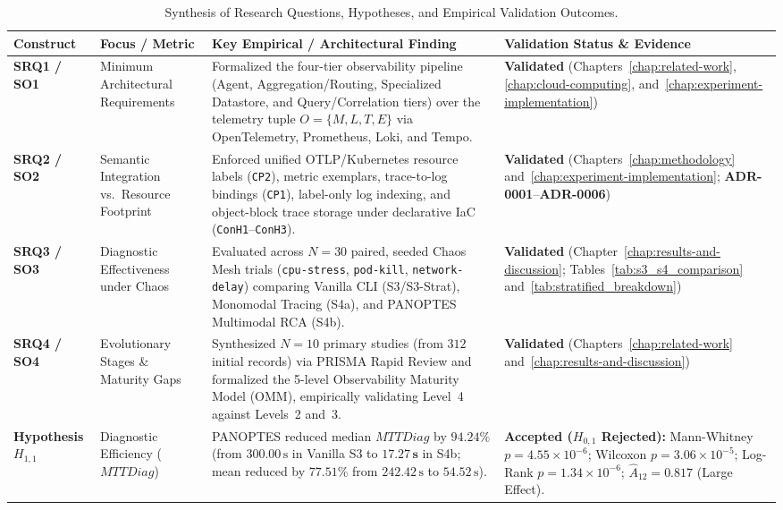 \begin{table}[htbp]
    \centering
    \caption{Synthesis of Research Questions, Hypotheses, and Empirical Validation Outcomes.}
    \label{tab:rq_hypothesis_synthesis}
    \footnotesize
    \renewcommand{\arraystretch}{1.2}
    \begin{tabularx}{\textwidth}{@{} l p{2.8cm} X p{3.6cm} @{}}
        \toprule
        \textbf{Construct} & \textbf{Focus / Metric} & \textbf{Key Empirical / Architectural Finding} & \textbf{Validation Status \& Evidence} \\
        \midrule
        \textbf{SRQ1 / SO1} & Minimum Architectural Requirements & Formalized the four-tier observability pipeline (Agent, Aggregation/Routing, Specialized Datastore, and Query/Correlation tiers) over the telemetry tuple $O = \{M, L, T, E\}$ via OpenTelemetry, Prometheus, Loki, and Tempo. & \textbf{Validated} (Chapters~\ref{chap:related-work}, \ref{chap:cloud-computing}, and~\ref{chap:experiment-implementation}) \\
        \addlinespace
        \textbf{SRQ2 / SO2} & Semantic Integration vs.\ Resource Footprint & Enforced unified OTLP/Kubernetes resource labels (\texttt{CP2}), metric exemplars, trace-to-log bindings (\texttt{CP1}), label-only log indexing, and object-block trace storage under declarative IaC (\texttt{ConH1}--\texttt{ConH3}). & \textbf{Validated} (Chapters~\ref{chap:methodology} and~\ref{chap:experiment-implementation}; \textbf{ADR-0001}--\textbf{ADR-0006}) \\
        \addlinespace
        \textbf{SRQ3 / SO3} & Diagnostic Effectiveness under Chaos & Evaluated across $N=30$ paired, seeded Chaos Mesh trials (\texttt{cpu-stress}, \texttt{pod-kill}, \texttt{network-delay}) comparing Vanilla CLI (S3/S3-Strat), Monomodal Tracing (S4a), and PANOPTES Multimodal RCA (S4b). & \textbf{Validated} (Chapter~\ref{chap:results-and-discussion}; Tables~\ref{tab:s3_s4_comparison} and~\ref{tab:stratified_breakdown}) \\
        \addlinespace
        \textbf{SRQ4 / SO4} & Evolutionary Stages \& Maturity Gaps & Synthesized $N=10$ primary studies (from $312$ initial records) via PRISMA Rapid Review and formalized the 5-level Observability Maturity Model (OMM), empirically validating Level~4 against Levels~2 and~3. & \textbf{Validated} (Chapters~\ref{chap:related-work} and~\ref{chap:results-and-discussion}) \\
        \midrule
        \textbf{Hypothesis $H_{1,1}$} & Diagnostic Efficiency ($MTTDiag$) & PANOPTES reduced median $MTTDiag$ by $\mathbf{94.24\%}$ (from $300.00\,\text{s}$ in Vanilla S3 to $\mathbf{17.27\,\text{s}}$ in S4b; mean reduced by $77.51\%$ from $242.42\,\text{s}$ to $54.52\,\text{s}$). & \textbf{Accepted ($H_{0,1}$ Rejected):} Mann-Whitney $p = 4.55 \times 10^{-6}$; Wilcoxon $p = 3.06 \times 10^{-5}$; Log-Rank $p = 1.34 \times 10^{-6}$; $\hat{A}_{12} = 0.817$ (Large Effect). \\

\end{tabularx}
\end{table}
